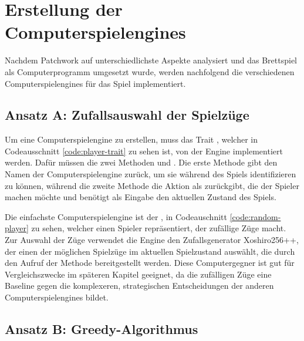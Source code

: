 \chapter{Erstellung der Computerspielengines}
\label{chapter:erstellung-der-computerspielengines}

Nachdem Patchwork auf unterschiedlichste Aspekte analysiert und das Brettspiel als Computerprogramm umgesetzt wurde, werden nachfolgend die verschiedenen Computerspielengines für das Spiel implementiert.

\section{Ansatz A: Zufallsauswahl der Spielzüge}
\label{section:erstellung-ansatz-a}

Um eine Computerspielengine zu erstellen, muss das Trait , welcher in Codeausschnitt \ref{code:player-trait} zu sehen ist, von der Engine implementiert werden. Dafür müssen die zwei Methoden  und . Die erste Methode gibt den Namen der Computerspielengine zurück, um sie während des Spiels identifizieren zu können, während die zweite Methode die Aktion als  zurückgibt, die der Spieler machen möchte und benötigt als Eingabe den aktuellen Zustand des Spiels.



Die einfachste Computerspielengine ist der , in Codeauschnitt \ref{code:random-player} zu sehen, welcher einen Spieler repräsentiert, der zufällige Züge macht. Zur Auswahl der Züge verwendet die Engine den Zufallsgenerator Xoshiro256++, der einen der möglichen Spielzüge im aktuellen Spielzustand  auswählt, die durch den Aufruf der Methode  bereitgestellt werden. Diese Computergegner ist gut für Vergleichszwecke im späteren Kapitel  geeignet, da die zufälligen Züge eine Baseline gegen die komplexeren, strategischen Entscheidungen der anderen Computerspielengines bildet.



\section{Ansatz B: Greedy-Algorithmus}

